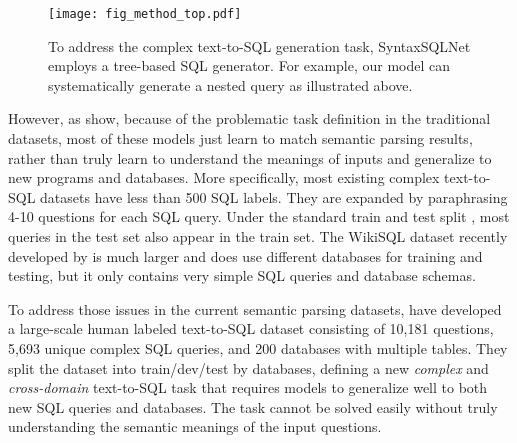 \documentclass[11pt,a4paper]{article}
\begin{document}
\begin{figure}[!t]
    \vspace{-1mm}\hspace{-1mm}
    \centering
    \texttt{[image: fig\_method\_top.pdf]}\vspace{-2mm}
    \caption{
    To address the complex text-to-SQL generation task, SyntaxSQLNet employs a tree-based SQL generator. For example, our model can systematically generate a nested query as illustrated above.
    }
\label{fig:task}
\vspace{-3mm}
\end{figure}

However, as \cite{cathy18} show, because of the problematic task definition in the traditional datasets, most of these models just learn to match semantic parsing results, rather than truly learn to understand the meanings of inputs and generalize to new programs and databases.
More specifically, most existing complex text-to-SQL datasets have less than 500 SQL labels. They are expanded by paraphrasing 4-10 questions for each SQL query. Under the standard train and test split \cite{Zettlemoyer05}, most queries in the test set also appear in the train set.
The WikiSQL dataset recently developed by \cite{Zhong2017} is much larger and does use different databases for training and testing, but it only contains very simple SQL queries and database schemas.


To address those issues in the current semantic parsing datasets, \citet{Yu&al.18.emnlp.corpus}
have developed a large-scale human labeled text-to-SQL dataset consisting of 10,181  questions, 5,693 unique complex SQL queries, and 200 databases with multiple tables.
They split the dataset into train/dev/test by databases, defining a new \textit{complex} and \textit{cross-domain} text-to-SQL task that requires models to generalize well to both new SQL queries and databases.
The task cannot be solved easily without truly understanding the semantic meanings of the input questions.
\end{document}
